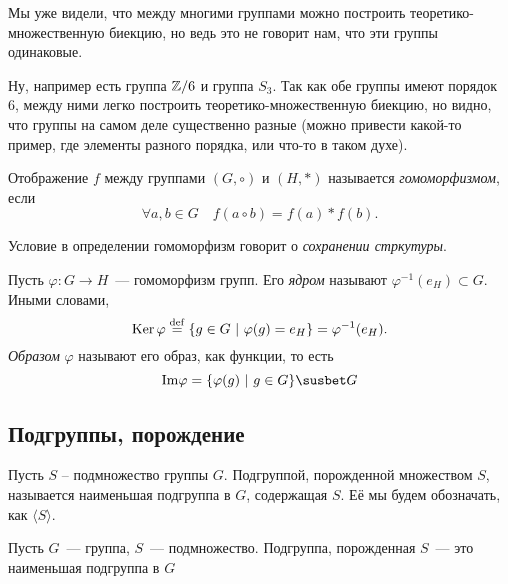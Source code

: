 	Мы уже видели, что между многими группами можно построить теоретико-множественную биекцию, но ведь это не говорит нам, что эти группы одинаковые. 

	\begin{example}
		Ну, например есть группа $\mathbb{Z}/6$ и группа $S_{3}$. Так как обе группы имеют порядок 6, между ними легко построить теоретико-множественную биекцию, но видно, что группы на самом деле существенно разные (можно привести какой-то пример, где элементы разного порядка, или что-то в таком духе). 
	\end{example}

	\begin{definition} 
		Отображение $f$ между группами $(G, \circ)$ и $(H, *)$ называется \emph{гомоморфизмом}, если 
		\[
			\forall a, b \in G \quad  f(a \circ b) = f(a) * f(b).
		\]
	\end{definition}

	Условие в определении гомоморфизм говорит о \emph{сохранении стркутуры}. 

	\begin{definition} 
		Пусть $\varphi\colon G \to H$~--- гомоморфизм групп. Его \emph{ядром} называют $\varphi^{-1}(e_{H}) \subset G$. Иными словами, 
		\[
			\operatorname{Ker}{\varphi} \stackrel{\mathrm{def}}{=} \{ g \in G \ \vert\  \varphi(g) = e_{H} \} = \varphi^{-1}(e_{H}).
		\]
		\emph{Образом} $\varphi$ называют его образ, как функции, то есть 
		\[
			\mathrm{Im}{\varphi} = \{ \varphi(g) \ \vert\  g \in G \} \susbet G
		\]
	\end{definition}

	\subsection{Подгруппы, порождение}

	\begin{definition} 
		 Пусть $S$ – подмножество группы $G$. Подгруппой, порожденной множеством $S$, называется наименьшая подгруппа в $G$, содержащая $S$.  Её мы будем обозначать, как $\langle S \rangle$.
	\end{definition}

	\begin{definition} 
		Пусть $G$~--- группа, $S$~--- подмножество. Подгруппа, порожденная $S$~--- это наименьшая подгруппа в $G$	
	\end{definition}

	



	

	






	

	




